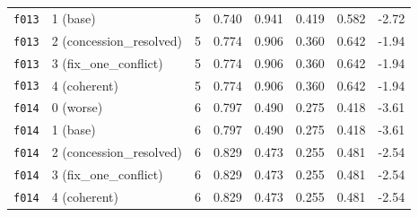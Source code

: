 \documentclass[11pt]{article}
\begin{document}
\begin{table}[htbp]
\begin{tabular}{llrrrrrr}
\texttt{f013} & 1 (base) & 5 & 0.740 & 0.941 & 0.419 & 0.582 & -2.72 \\
\texttt{f013} & 2 (concession\_resolved) & 5 & 0.774 & 0.906 & 0.360 & 0.642 & -1.94 \\
\texttt{f013} & 3 (fix\_one\_conflict) & 5 & 0.774 & 0.906 & 0.360 & 0.642 & -1.94 \\
\texttt{f013} & 4 (coherent) & 5 & 0.774 & 0.906 & 0.360 & 0.642 & -1.94 \\
\midrule
\texttt{f014} & 0 (worse) & 6 & 0.797 & 0.490 & 0.275 & 0.418 & -3.61 \\
\texttt{f014} & 1 (base) & 6 & 0.797 & 0.490 & 0.275 & 0.418 & -3.61 \\
\texttt{f014} & 2 (concession\_resolved) & 6 & 0.829 & 0.473 & 0.255 & 0.481 & -2.54 \\
\texttt{f014} & 3 (fix\_one\_conflict) & 6 & 0.829 & 0.473 & 0.255 & 0.481 & -2.54 \\
\texttt{f014} & 4 (coherent) & 6 & 0.829 & 0.473 & 0.255 & 0.481 & -2.54 \\
\bottomrule
\end{tabular}
\end{table}
\end{document}
